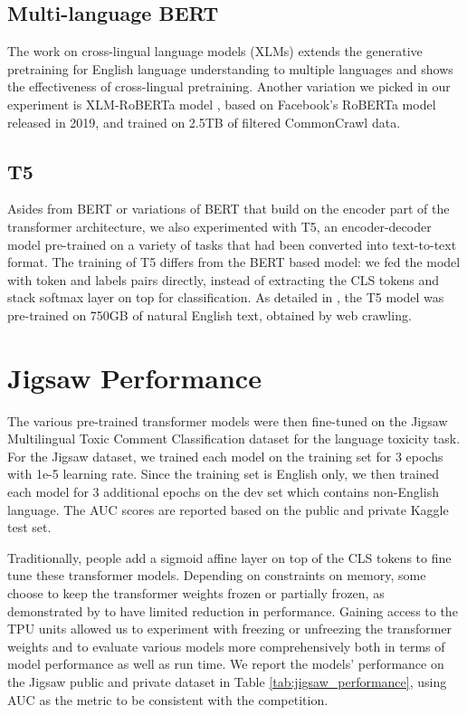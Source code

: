 \documentclass[11pt,a4paper]{article}
\begin{document}
\subsection{Multi-language BERT}
The work on cross-lingual language models (XLMs) \citep{DBLP:journals/corr/abs-1901-07291} extends the generative pretraining for English language understanding to multiple languages and shows the effectiveness of cross-lingual pretraining. Another variation we picked in our experiment is XLM-RoBERTa model \citep{conneau2019unsupervised}, based on Facebook’s RoBERTa model released in 2019, and trained on 2.5TB of filtered CommonCrawl data. 

\subsection{T5}
Asides from BERT or variations of BERT that build on the encoder part of the transformer architecture, we also experimented with T5, an encoder-decoder model pre-trained on a variety of tasks that had been converted into text-to-text format. The training of T5 differs from the BERT based model: we fed the model with token and labels pairs directly, instead of extracting the CLS tokens and stack softmax layer on top for classification. As detailed in \citep{raffel2019exploring}, the T5 model was pre-trained on 750GB of natural English text, obtained by web crawling.


\section{Jigsaw Performance}
The various pre-trained transformer models were then fine-tuned on the Jigsaw Multilingual Toxic Comment Classification dataset for the language toxicity task. For the Jigsaw dataset, we trained each model on the training set for 3 epochs with 1e-5 learning rate. Since the training set is English only, we then trained each model for 3 additional epochs on the dev set which contains non-English language. The AUC scores are reported based on the public and private Kaggle test set.

Traditionally, people add a sigmoid affine layer on top of the CLS tokens to fine tune these transformer models. Depending on constraints on memory, some choose to keep the transformer weights frozen or partially frozen, as demonstrated by \citep{lee2019elsa} to have limited reduction in performance. Gaining access to the TPU units allowed us to experiment with freezing or unfreezing the transformer weights and to evaluate various models more comprehensively both in terms of model performance as well as run time. %
We report the models' performance on the Jigsaw public and private dataset in Table \ref{tab:jigsaw_performance}, using AUC as the metric to be consistent with the competition. 
\end{document}
